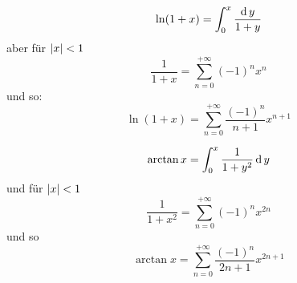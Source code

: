 \begin{Bsp}
  \[\ln(1+x)=\int_0^x\frac{\operatorname{d} y}{1+y}\]
  aber für $\mathopen| x \mathclose|<1$
  \[\frac{1}{1+x}=\sum_{n=0}^{+\infty}(-1)^nx^n\]
  und so:
  \[\ln(1+x)=\sum^{+\infty}_{n=0}\frac{(-1)^n}{n+1}x^{n+1}\]
\end{Bsp}
\begin{Bsp}
  \[\arctan x=\int_0^x\frac{1}{1+y^2}\operatorname{d} y\]
  und für $\mathopen| x \mathclose|<1$
  \[\frac{1}{1+x^2}=\sum_{n=0}^{+\infty}(-1)^nx^{2n}\]
  und so
  \[\arctan x=\sum^{+\infty}_{n=0}\frac{(-1)^n}{2n+1}x^{2n+1}\]
\end{Bsp}
